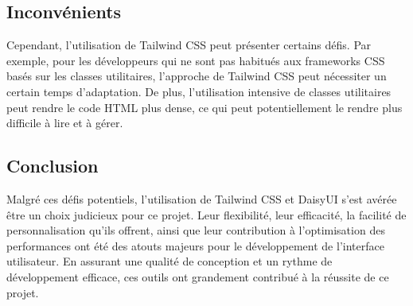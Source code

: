 \subsection{Inconvénients}

Cependant, l'utilisation de Tailwind CSS peut présenter certains défis. Par exemple, pour les développeurs qui ne sont pas habitués aux frameworks CSS basés sur les classes utilitaires, l'approche de Tailwind CSS peut nécessiter un certain temps d'adaptation. De plus, l'utilisation intensive de classes utilitaires peut rendre le code HTML plus dense, ce qui peut potentiellement le rendre plus difficile à lire et à gérer.

\subsection{Conclusion}

Malgré ces défis potentiels, l'utilisation de Tailwind CSS et DaisyUI s'est avérée être un choix judicieux pour ce projet. Leur flexibilité, leur efficacité, la facilité de personnalisation qu'ils offrent, ainsi que leur contribution à l'optimisation des performances ont été des atouts majeurs pour le développement de l'interface utilisateur. En assurant une qualité de conception et un rythme de développement efficace, ces outils ont grandement contribué à la réussite de ce projet.